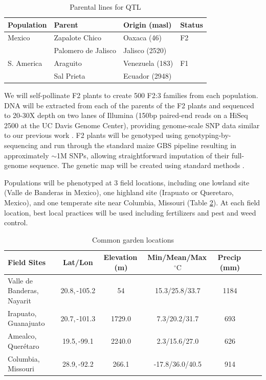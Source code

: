 \begin{table}
\begin{center}
\caption{Parental lines for QTL} \label{tab:qtlpops}
\begin{tabular}{llll}\\\toprule  
{\bf Population}	& {\bf Parent } &	{\bf Origin (masl)} & {\bf Status }\\ \midrule
 \rowcolor{gray!25}
Mexico	& Zapalote Chico		& Oaxaca	 (46)		&  F2 \\ 
 \rowcolor{gray!25}
	& 	Palomero de Jalisco	& 	Jalisco (2520)		& \\
S. America	& Araguito	& Venezuela (183)	&  F1 \\ 
	& Sal Prieta	 & Ecuador (2948) & \\ \bottomrule
\end{tabular}
\end{center}
\end{table} 

We will self-pollinate F2 plants to create 500 F2:3 families from each population.  DNA will be extracted from each of the parents of the F2 plants and sequenced to 20-30X depth on two lanes of Illumina (150bp paired-end reads on a HiSeq 2500 at the UC Davis Genome Center), providing genome-scale SNP data similar to our previous work \citep[HapMap.v2;][]{Chia2012a}.  F2 plants will be genotyped using genotyping-by-sequencing \citep[GBS;][]{Elshire2011} and run through the standard maize GBS pipeline \citep{Glaubitz2014} resulting in approximately $\sim$1M SNPs, allowing straightforward imputation of their full-genome sequence.  The genetic map will be created using standard methods \citep[e.g.][]{Broman2003a}. 

Populations will be phenotyped at 3 field locations, including one lowland site (Valle de Banderas in Mexico), one highland site (Irapuato or Queretaro, Mexico), and one temperate site near Columbia, Missouri (Table \ref{tab:locales}).  At each field location, best local practices will be used including fertilizers and pest and weed control.

\begin{table}
\begin{center}
\caption{Common garden locations} \label{tab:locales}
\begin{tabular}{p{2cm}cccccc}\\\toprule  
{\bf Field Sites} & {\bf Lat/Lon } & {\bf Elevation\,(m) } &	{\bf Min/Mean/Max\,$^{\circ}\mathrm{C}$  } & {\bf Precip\,(mm) } \\ \toprule
Valle de Banderas, Nayarit	& 20.8,\,-105.2&	54		&	15.3/25.8/33.7	&	1184 \\
Irapuato, Guanajuato 	&	20.7,\,-101.3	&	1729.0	&	7.3/20.2/31.7	&	693 \\
Amealco, Quer\'etaro 	&	19.5,\,-99.1	&	2240.0 	&	2.3/15.6/27.0	&	626\\
Columbia, Missouri		& 	28.9,\,-92.2	&	266.1 	&	-17.8/36.0/40.5&	914\\ \bottomrule
\end{tabular}
\end{center}
\end{table} 

